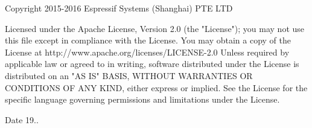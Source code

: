 \begin{DoxyVerb}   Copyright 2015-2016 Espressif Systems (Shanghai) PTE LTD

   Licensed under the Apache License, Version 2.0 (the "License");    
   you may not use this file except in compliance with the License.    
   You may obtain a copy of the License at    
   http://www.apache.org/licenses/LICENSE-2.0    
   Unless required by applicable law or agreed to in writing, software    
   distributed under the License is distributed on an "AS IS" BASIS,    
   WITHOUT WARRANTIES OR CONDITIONS OF ANY KIND, either express or implied.    
   See the License for the specific language governing permissions and    
   limitations under the License.
\end{DoxyVerb}


\begin{DoxyDate}{Date}
19.. 
\end{DoxyDate}
